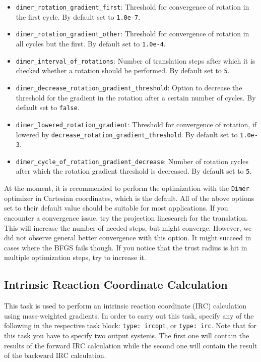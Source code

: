 \documentclass[]{tufte-book}
\begin{document}
\begin{itemize}
\item \texttt{dimer\_rotation\_gradient\_first}: Threshold for convergence of rotation in the first cycle. By default set to \texttt{1.0e-7}.
\item \texttt{dimer\_rotation\_gradient\_other}: Threshold for convergence of rotation in all cycles but the first. By default set to \texttt{1.0e-4}.
\item \texttt{dimer\_interval\_of\_rotations}: Number of translation steps after which it is checked whether a rotation should be performed. By default set to \texttt{5}.
\item \texttt{dimer\_decrease\_rotation\_gradient\_threshold}: Option to decrease the threshold for the gradient in the rotation after a certain number of cycles. By default set to \texttt{false}.
\item \texttt{dimer\_lowered\_rotation\_gradient}: Threshold for convergence of rotation, if lowered by \texttt{decrease\_rotation\_gradient\_threshold}. By default set to \texttt{1.0e-3}.
\item \texttt{dimer\_cycle\_of\_rotation\_gradient\_decrease}: Number of rotation cycles after which the rotation gradient threshold is decreased. By default set to \texttt{5}.
\end{itemize}
At the moment, it is recommended to perform the optimization with the \texttt{Dimer} optimizer in Cartesian coordinates, which is the default. All of the above options set to their default value should be suitable for most applications. If you encounter a convergence issue, try the projection linesearch for the translation. This will increase the number of needed steps, but might converge. However, we did not observe general better convergence with this option. It might succeed in cases where the BFGS fails though. If you notice that the trust radius is hit in multiple optimization steps, try to increase it.

\subsection{Intrinsic Reaction Coordinate Calculation}

This task is used to perform an intrinsic reaction coordinate (IRC) calculation using mass-weighted gradients.
In order to carry out this task, specify any of the following in the respective task block: \texttt{type: ircopt},
or \texttt{type: irc}. Note that for this task you have to specify two output systems. The first one will contain
the results of the forward IRC calculation while the second one will contain the result of the backward IRC calculation.
\end{document}

